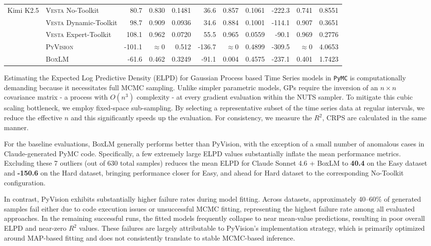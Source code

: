\documentclass{article}
\begin{document}
\begin{table}[t]
{\begin{tabular}{ll|rrr|rrr|rrr}
\midrule
\multirow{5}{*}{Kimi K2.5} & \textsc{Vesta} No-Toolkit & 80.7 & 0.830 & 0.1481 & 36.6 & 0.857 & 0.1061 & -222.3 & 0.741 & 0.8551 \\
 & \textsc{Vesta} Dynamic-Toolkit & 98.7 & 0.909 & 0.0936 & 34.6 & 0.884 & 0.1001 & -114.1 & 0.907 & 0.3651 \\
 & \textsc{Vesta} Expert-Toolkit & 108.1 & 0.962 & 0.0720 & 55.5 & 0.965 & 0.0559 & -90.1 & 0.969 & 0.2776 \\
 & \textsc{PyVision} & -101.1 & $\approx 0$ & 0.512 & -136.7 & $\approx 0$ & 0.4899 & -309.5 & $\approx 0$ & 4.0653 \\
 & \textsc{BoxLM} & -61.6 & 0.462 & 0.3249 & -91.1 & 0.004 & 0.4575 & -237.1 & 0.401 & 1.7423 \\
\bottomrule
\end{tabular}%
}
\end{table}

\noindent Estimating the Expected Log Predictive Density (ELPD) for Gaussian Process based Time Series models 
in \texttt{PyMC} is computationally demanding because it necessitates full MCMC sampling. Unlike simpler parametric models, GPs require the inversion of 
an $n \times n$ covariance matrix - a process with $O(n^3)$ complexity - at every gradient 
evaluation within the NUTS sampler. To mitigate this cubic scaling bottleneck, we employ fixed-space sub-sampling. By selecting a 
representative subset of the time series data at regular intervals, we reduce the effective 
$n$ and this significantly speeds up the evaluation. For consistency, we measure the $R^{2}$, CRPS are calculated in the same manner.

For the baseline evaluations, BoxLM generally performs better than PyVision, with the exception of a small number of anomalous cases in Claude-generated PyMC code. Specifically, a few extremely large ELPD values substantially inflate the mean performance metrics. Excluding these 7 outliers (out of 630 total samples) reduces the mean ELPD for Claude Sonnet 4.6 + BoxLM to \textbf{40.4} on the Easy dataset and \textbf{-150.6} on the Hard dataset, bringing performance closer for Easy, and ahead for Hard dataset to the corresponding No-Toolkit configuration. \par

In contrast, PyVision exhibits substantially higher failure rates during model fitting. Across datasets, approximately 40--60\% of generated samples fail either due to code execution issues or unsuccessful MCMC fitting, representing the highest failure rate among all evaluated approaches. In the remaining successful runs, the fitted models frequently collapse to near mean-value predictions, resulting in poor overall ELPD and near-zero $R^{2}$ values. These failures are largely attributable to PyVision's implementation strategy, which is primarily optimized around MAP-based fitting and does not consistently translate to stable MCMC-based inference.
\end{document}
